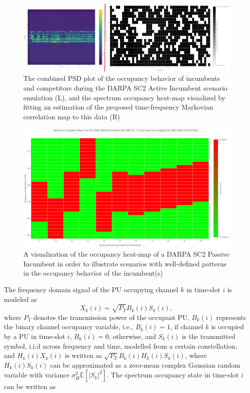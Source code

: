 \documentclass[12pt, draftcls, onecolumn]{IEEEtran}
\begin{document}
\begin{figure} [htb]
    \centerline{
    \includegraphics[width = 1.0\linewidth]{figures/Combined_PSD_Measurement_Gateway_SC2_Active_Incumbent.png}}
    \caption{The combined PSD plot of the occupancy behavior of incumbents and competitors during the DARPA SC2 Active Incumbent scenario emulation (L), and the spectrum occupancy heat-map visualized by fitting an estimation of the proposed time-frequency Markovian correlation map to this data (R)}
    \label{fig:A.psd}
\end{figure}
\begin{figure} [htb]
    \centerline{
    \includegraphics[width = 0.8\linewidth]{figures/SC2_Passive_Incumbent_Occupancy_Heatmap.png}}
    \caption{A visualization of the occupancy heat-map of a DARPA SC2 Passive Incumbent in order to illustrate scenarios with well-defined patterns in the occupancy behavior of the incumbent(s)}
    \label{fig:A.passive}
\end{figure}
The frequency domain signal of the PU occupying channel $k$ in time-slot $i$ is modeled as
\begin{equation}\label{3}
    X_{k}(i)=\sqrt{P_{T}}B_{k}(i)S_{k}(i),
\end{equation}
where $P_{T}$ denotes the transmission power of the occupant PU, $B_{k}(i)$ represents the binary channel occupancy variable, i.e., $B_{k}(i){=}1$, if channel $k$ is occupied by a PU in time-slot $i$, $B_{k}(i){=}0$, otherwise, and $S_{k}(i)$ is the transmitted symbol, i.i.d across frequency and time, modelled from a certain constellation, and $H_{k}(i)X_{k}(i)$ is written as $\sqrt{P_{T}}B_{k}(i)H_{k}(i)S_{k}(i)$, where $H_{k}(i)S_{k}(i)$ can be approximated as a zero-mean complex Gaussian random variable with variance $\sigma_{H}^{2}\mathbb{E}[|S_{k}|^{2}]$. The spectrum occupancy state in time-slot $i$ can be written as
\end{document}
